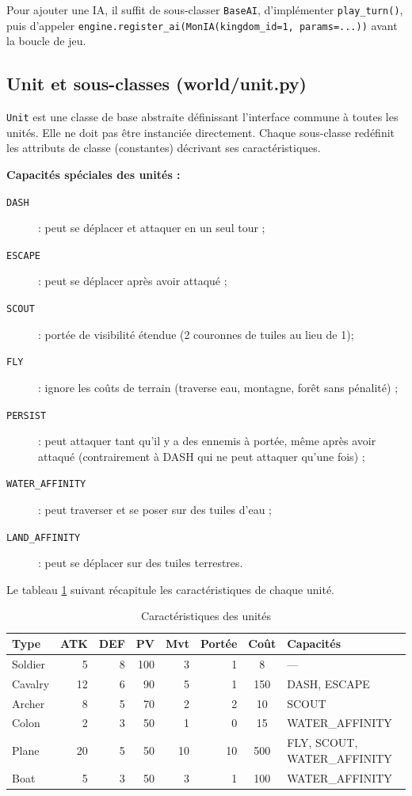\documentclass[12pt, a4paper]{article}
\begin{document}
Pour ajouter une IA, il suffit de sous-classer \texttt{BaseAI}, d'implémenter
\texttt{play\_turn()}, puis d'appeler \texttt{engine.register\_ai(MonIA(kingdom\_id=1,
params=...))} avant la boucle de jeu.

\subsection{Unit et sous-classes (world/unit.py)}

\texttt{Unit} est une classe de base abstraite définissant l'interface commune à toutes les
unités. Elle ne doit pas être instanciée directement. Chaque sous-classe redéfinit les
attributs de classe (constantes) décrivant ses caractéristiques.

\medskip
\noindent\textbf{Capacités spéciales des unités :}
\begin{description}
    \item[\texttt{DASH}] : peut se déplacer et attaquer en un seul tour ;
    \item[\texttt{ESCAPE}] : peut se déplacer après avoir attaqué ;
    \item[\texttt{SCOUT}] : portée de visibilité étendue (2 couronnes de tuiles au lieu de 1);
    \item[\texttt{FLY}] : ignore les coûts de terrain (traverse eau, montagne, forêt sans pénalité) ;
    \item[\texttt{PERSIST}] : peut attaquer tant qu'il y a des ennemis à portée, même après avoir attaqué (contrairement à DASH qui ne peut attaquer qu'une fois) ;
    \item[\texttt{WATER\_AFFINITY}] : peut traverser et se poser sur des tuiles d'eau ;
    \item[\texttt{LAND\_AFFINITY}] : peut se déplacer sur des tuiles terrestres.
\end{description}

\medskip
Le tableau \ref{tab:unites} suivant récapitule les caractéristiques de chaque unité.

\begin{table}[H]
\centering
\begin{tabular}{lrrrrrcl}
\toprule
\textbf{Type} & \textbf{ATK} & \textbf{DEF} & \textbf{PV} & \textbf{Mvt} & \textbf{Portée} & \textbf{Coût} & \textbf{Capacités} \\
\midrule
Soldier  & 5 & 8   & 100 & 3  & 1 & 8 & --- \\
Cavalry  & 12       & 6   & 90  & 5  & 1 & 150  & DASH, ESCAPE \\
Archer   & 8        & 5   & 70  & 2  & 2 & 10   & SCOUT \\
Colon    & 2        & 3   & 50  & 1  & 0 & 15   & WATER\_AFFINITY \\
Plane    & 20       & 5   & 50  & 10 & 10 & 500  & FLY, SCOUT, WATER\_AFFINITY \\
Boat     & 5        & 3   & 50  & 3  & 1 & 100   & WATER\_AFFINITY \\
\bottomrule
\end{tabular}
\caption{Caractéristiques des unités}
\label{tab:unites}
\end{table}
\end{document}
